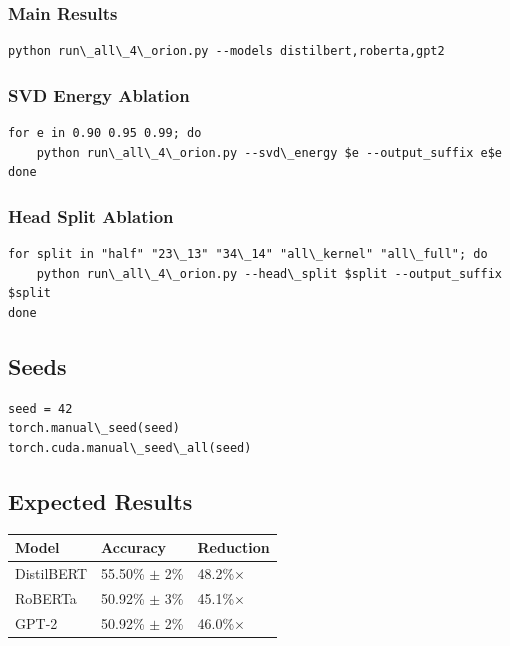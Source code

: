 \subsubsection{Main Results}

\begin{lstlisting}
python run\_all\_4\_orion.py --models distilbert,roberta,gpt2
\end{lstlisting}

\subsubsection{SVD Energy Ablation}

\begin{lstlisting}
for e in 0.90 0.95 0.99; do
    python run\_all\_4\_orion.py --svd\_energy $e --output_suffix e$e
done
\end{lstlisting}

\subsubsection{Head Split Ablation}

\begin{lstlisting}
for split in "half" "23\_13" "34\_14" "all\_kernel" "all\_full"; do
    python run\_all\_4\_orion.py --head\_split $split --output_suffix $split
done
\end{lstlisting}

\subsection{Seeds}

\begin{lstlisting}
seed = 42
torch.manual\_seed(seed)
torch.cuda.manual\_seed\_all(seed)
\end{lstlisting}

\subsection{Expected Results}

\begin{table}[H]
\centering
\small
\begin{tabular}{lll}
\toprule
\textbf{Model} & \textbf{Accuracy} & \textbf{Reduction} \\
\midrule
DistilBERT & 55.50\% $\pm$ 2\% & 48.2\%$\times$ \\
RoBERTa & 50.92\% $\pm$ 3\% & 45.1\%$\times$ \\
GPT-2 & 50.92\% $\pm$ 2\% & 46.0\%$\times$ \\
\bottomrule
\end{tabular}
\end{table}

